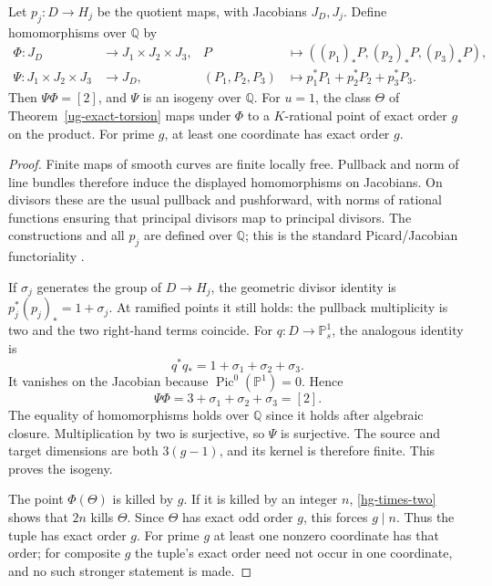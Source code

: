 \begin{theorem}
\label{hg-isogeny}
Let $p_j:D\to H_j$ be the quotient maps, with Jacobians $J_D,J_j$.
Define homomorphisms over $\mathbb Q$ by
\begin{align}
 \Phi:J_D&\longrightarrow J_1\times J_2\times J_3,
 &P&\longmapsto ((p_1)_*P,(p_2)_*P,(p_3)_*P),\label{hg-norm-map}\\
 \Psi:J_1\times J_2\times J_3&\longrightarrow J_D,
 &(P_1,P_2,P_3)&\longmapsto
 p_1^*P_1+p_2^*P_2+p_3^*P_3.\label{hg-pullback-map}
\end{align}
Then $\Psi\Phi=[2]$, and $\Psi$ is an isogeny over $\mathbb Q$.
For $u=1$, the class $\Theta$ of
Theorem~\ref{ug-exact-torsion} maps under $\Phi$ to a
$K$-rational point of exact order $g$ on the product.
For prime $g$, at least one coordinate has exact order $g$.
\end{theorem}
\begin{proof}
Finite maps of smooth curves are finite locally free. Pullback
and norm of line bundles therefore induce the displayed
homomorphisms on Jacobians. On divisors these are the usual
pullback and pushforward, with norms of rational functions
ensuring that principal divisors map to principal divisors.
The constructions and all $p_j$ are defined over $\mathbb Q$;
this is the standard Picard/Jacobian functoriality
\cite{MilneJV2021}.

If $\sigma_j$ generates the group of $D\to H_j$, the geometric
divisor identity is $p_j^*(p_j)_*=1+\sigma_j$.
At ramified points it still holds: the pullback multiplicity
is two and the two right-hand terms coincide.
For $q:D\to\mathbb P^1_s$, the analogous identity is
\[
 q^*q_*=1+\sigma_1+\sigma_2+\sigma_3.
\]
It vanishes on the Jacobian because
$\operatorname{Pic}^0(\mathbb P^1)=0$. Hence
\begin{equation}\label{hg-times-two}
 \Psi\Phi=3+\sigma_1+\sigma_2+\sigma_3=[2].
\end{equation}
The equality of homomorphisms holds over $\mathbb Q$ since
it holds after algebraic closure. Multiplication by two is
surjective, so $\Psi$ is surjective. The source and target
dimensions are both $3(g-1)$, and its kernel is therefore
finite. This proves the isogeny.

The point $\Phi(\Theta)$ is killed by $g$. If it is killed by
an integer $n$, \eqref{hg-times-two} shows that $2n$ kills
$\Theta$. Since $\Theta$ has exact odd order $g$, this forces
$g\mid n$. Thus the tuple has exact order $g$. For prime $g$
at least one nonzero coordinate has that order; for composite
$g$ the tuple's exact order need not occur in one coordinate,
and no such stronger statement is made.
\end{proof}


